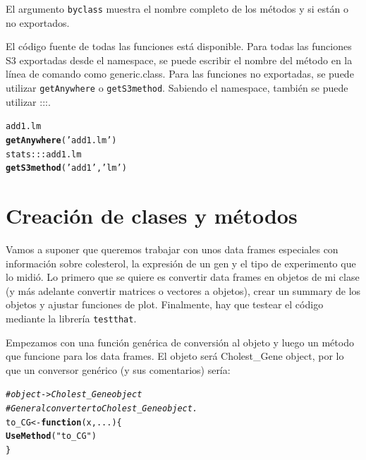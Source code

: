 \documentclass{config/apuntes}\usepackage[]{graphicx}\usepackage[]{xcolor}
\makeatletter
\newcommand{\hlsng}[1]{\textcolor[rgb]{0.192,0.494,0.8}{#1}}%
\newcommand{\hlcom}[1]{\textcolor[rgb]{0.678,0.584,0.686}{\textit{#1}}}%
\newcommand{\hlopt}[1]{\textcolor[rgb]{0,0,0}{#1}}%
\newcommand{\hldef}[1]{\textcolor[rgb]{0.345,0.345,0.345}{#1}}%
\newcommand{\hlkwa}[1]{\textcolor[rgb]{0.161,0.373,0.58}{\textbf{#1}}}%
\newcommand{\hlkwb}[1]{\textcolor[rgb]{0.69,0.353,0.396}{#1}}%
\newcommand{\hlkwc}[1]{\textcolor[rgb]{0.333,0.667,0.333}{#1}}%
\newcommand{\hlkwd}[1]{\textcolor[rgb]{0.737,0.353,0.396}{\textbf{#1}}}%
\newenvironment{kframe}{%
 \def\at@end@of@kframe{}%
 \ifinner\ifhmode%
  \def\at@end@of@kframe{\end{minipage}}%
  \begin{minipage}{\columnwidth}%
 \fi\fi%
 \def\FrameCommand##1{\hskip\@totalleftmargin \hskip-\fboxsep
 \colorbox{shadecolor}{##1}\hskip-\fboxsep
     \hskip-\linewidth \hskip-\@totalleftmargin \hskip\columnwidth}%
 \MakeFramed {\advance\hsize-\width
   \@totalleftmargin\z@ \linewidth\hsize
   \@setminipage}}%
 {\par\unskip\endMakeFramed%
 \at@end@of@kframe}
\newenvironment{knitrout}{}{} %
\newcommand{\code}[1]{\texttt{#1}}
\makeatother
\begin{document}
El argumento \code{byclass} muestra el nombre completo de los métodos y si están o no exportados. 

El código fuente de todas las funciones está disponible. Para todas las funciones S3 exportadas desde el namespace, se puede escribir el nombre del método en la línea de comando como generic.class. Para las funciones no exportadas, se puede utilizar \code{getAnywhere} o \code{getS3method}. Sabiendo el namespace, también se puede utilizar :::. 

\begin{knitrout}
\color{fgcolor}\begin{kframe}
\begin{alltt}
\hldef{add1.lm}
\hlkwd{getAnywhere}\hldef{(}\hlsng{'add1.lm'}\hldef{)}
\hldef{stats}\hlopt{:::}\hldef{add1.lm}
\hlkwd{getS3method}\hldef{(}\hlsng{'add1'}\hldef{,} \hlsng{'lm'}\hldef{)}
\end{alltt}
\end{kframe}
\end{knitrout}

\section{Creación de clases y métodos}
Vamos a suponer que queremos trabajar con unos data frames especiales con información sobre colesterol, la expresión de un gen y el tipo de experimento que lo midió. Lo primero que se quiere es convertir data frames en objetos de mi clase (y más adelante convertir matrices o vectores a objetos), crear un summary de los objetos y ajustar funciones de plot. Finalmente, hay que testear el código mediante la librería \code{testthat}.

Empezamos con una función genérica de conversión al objeto y luego un método que funcione para los data frames. El objeto será Cholest\_Gene object, por lo que un conversor genérico (y sus comentarios) sería:

\begin{knitrout}
\color{fgcolor}\begin{kframe}
\begin{alltt}
\hlcom{# object -> Cholest_Gene object}
\hlcom{# General converter to Cholest_Gene object.}
\hldef{to_CG} \hlkwb{<-} \hlkwa{function}\hldef{(}\hlkwc{x}\hldef{,} \hlkwc{...}\hldef{) \{}
  \hlkwd{UseMethod}\hldef{(}\hlsng{"to_CG"}\hldef{)}
\hldef{\}}
\end{alltt}
\end{kframe}
\end{knitrout}
\end{document}
